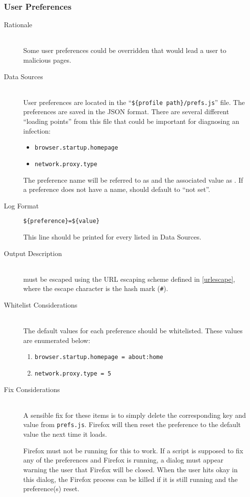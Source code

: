 \subsubsection{User Preferences}
\begin{description}
\item[Rationale] \hfill \\
Some user preferences could be overridden that would lead a user to malicious
pages.  
\item[Data Sources] \hfill \\
User preferences are located in the ``\verb|${profile path}/prefs.js|'' file. 
The preferences are saved in the JSON format. There are several different
``loading points'' from this file that could be important for diagnosing an
infection:
\begin{itemize}
  \item \verb|browser.startup.homepage|
  \item \verb|network.proxy.type|
\end{itemize}
The preference name will be referred to as  and the associated
value as .  If a preference does not have a name,  should
default to ``not set''.
\item[Log Format] \hfill 
\vspace{-\baselineskip}
\begin{verbatim}
${preference}=${value}
\end{verbatim}
This line should be printed for every  listed in Data Sources.
\item[Output Description] \hfill \\
 must be escaped using the URL escaping scheme defined in
\ref{urlescape}, where the escape character is the hash mark (\verb|#|).
\item[Whitelist Considerations] \hfill \\
The default values for each preference should be whitelisted.  These values are
enumerated below:
\begin{enumerate}
  \item \verb|browser.startup.homepage = about:home|
  \item \verb|network.proxy.type = 5|
\end{enumerate}

\item[Fix Considerations] \hfill \\
A sensible fix for these items is to simply delete the corresponding key and
value from \verb|prefs.js|.  Firefox will then reset the preference to the
default value the next time it loads.

Firefox must not be running for this to work.  If a script is supposed to fix
any of the preferences and Firefox is running, a dialog must appear warning the
user that Firefox will be closed.  When the user hits okay in this dialog, the
Firefox process can be killed if it is still running and the preference(s)
reset.
\end{description}

